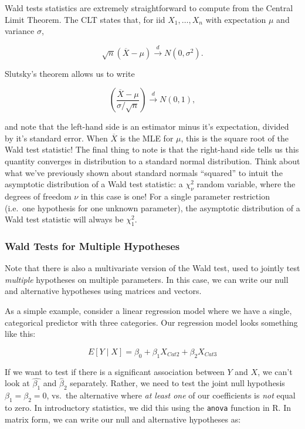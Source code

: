 \documentclass[
  letterpaper,
  DIV=11,
  numbers=noendperiod]{scrreprt}
\begin{document}
Wald tests statistics are extremely straightforward to compute from the
Central Limit Theorem. The CLT states that, for iid \(X_1, \dots, X_n\)
with expectation \(\mu\) and variance \(\sigma\),

\[
\sqrt{n} (\overline{X} - \mu) \overset{d}{\to} N(0, \sigma^2).
\]

Slutsky's theorem allows us to write

\[
\left( \frac{\overline{X} - \mu}{\sigma / \sqrt{n}}\right) \overset{d}{\to} N(0,1),
\]

and note that the left-hand side is an estimator minus it's expectation,
divided by it's standard error. When \(\overline{X}\) is the MLE for
\(\mu\), this is the square root of the Wald test statistic! The final
thing to note is that the right-hand side tells us this quantity
converges in distribution to a standard normal distribution. Think about
what we've previously shown about standard normals ``squared'' to intuit
the asymptotic distribution of a Wald test statistic: a \(\chi^2_\nu\)
random variable, where the degrees of freedom \(\nu\) in this case is
one! For a single parameter restriction (i.e.~one hypothesis for one
unknown parameter), the asymptotic distribution of a Wald test statistic
will always be \(\chi^2_1\).

\subsubsection*{Wald Tests for Multiple
Hypotheses}\label{wald-tests-for-multiple-hypotheses}

Note that there is also a multivariate version of the Wald test, used to
jointly test \emph{multiple} hypotheses on multiple parameters. In this
case, we can write our null and alternative hypotheses using matrices
and vectors.

As a simple example, consider a linear regression model where we have a
single, categorical predictor with three categories. Our regression
model looks something like this:

\[
E[Y \mid X] = \beta_0 + \beta_1 X_{Cat2} + \beta_2 X_{Cat3}
\]

If we want to test if there is a significant association between \(Y\)
and \(X\), we can't look at \(\hat{\beta_1}\) and \(\hat{\beta}_2\)
separately. Rather, we need to test the joint null hypothesis
\(\beta_1 = \beta_2 = 0\), vs.~the alternative where \emph{at least one}
of our coefficients is \emph{not} equal to zero. In introductory
statistics, we did this using the \texttt{anova} function in R. In
matrix form, we can write our null and alternative hypotheses as:
\end{document}
